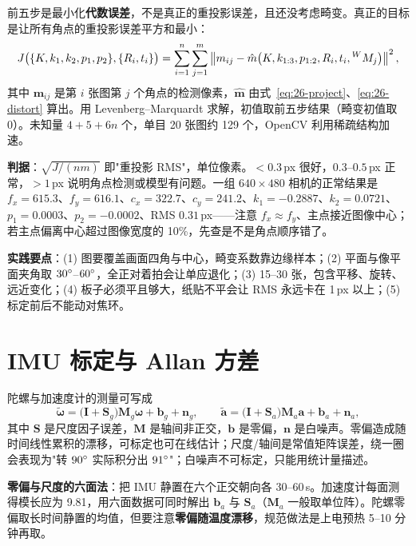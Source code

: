 前五步是最小化\textbf{代数误差}，不是真正的重投影误差，且还没考虑畸变。真正的目标是让所有角点的重投影误差平方和最小：
\begin{equation}
J\bigl(\{K,k_1,k_2,p_1,p_2\},\{R_i,t_i\}\bigr)
=\sum_{i=1}^{n}\sum_{j=1}^{m}\left\lVert m_{ij}-\hat{m}\bigl(K,k_{1:3},p_{1:2},R_i,t_i,{}^{W}M_j\bigr) \right\rVert^{2},
\label{eq:26-reproj}
\end{equation}
其中 $\bm{m}_{ij}$ 是第 $i$ 张图第 $j$ 个角点的检测像素，$\hat{\bm{m}}$ 由式~\eqref{eq:26-project}、\eqref{eq:26-distort} 算出。用 Levenberg--Marquardt 求解，初值取前五步结果（畸变初值取 0）。未知量 $4+5+6n$ 个，单目 20 张图约 129 个，OpenCV 利用稀疏结构加速。

\textbf{判据}：$\sqrt{J/(nm)}$ 即"重投影 RMS"，单位像素。$<0.3$\,px 很好，$0.3$--$0.5$\,px 正常，$>1$\,px 说明角点检测或模型有问题。一组 $640\times480$ 相机的正常结果是 $f_x=615.3$、$f_y=616.1$、$c_x=322.7$、$c_y=241.2$、$k_1=-0.2887$、$k_2=0.0721$、$p_1=0.0003$、$p_2=-0.0002$、RMS $0.31$\,px——注意 $f_x\approx f_y$、主点接近图像中心；若主点偏离中心超过图像宽度的 10\%，先查是不是角点顺序错了。

\textbf{实践要点}：(1) 图要覆盖画面四角与中心，畸变系数靠边缘样本；(2) 平面与像平面夹角取 $30^\circ$--$60^\circ$，全正对着拍会让单应退化；(3) 15--30 张，包含平移、旋转、远近变化；(4) 板子必须平且够大，纸贴不平会让 RMS 永远卡在 1\,px 以上；(5) 标定前后不能动对焦环。

\section{IMU 标定与 Allan 方差}\label{sec:26-imu}

陀螺与加速度计的测量可写成
\begin{equation}
\tilde{\bm{\omega}}=\bigl(\bm{I}+\bm{S}_g\bigr)\bm{M}_g\bm{\omega}+\bm{b}_g+\bm{n}_g,\qquad
\tilde{\bm{a}}=\bigl(\bm{I}+\bm{S}_a\bigr)\bm{M}_a\bm{a}+\bm{b}_a+\bm{n}_a,
\label{eq:26-imuerr}
\end{equation}
其中 $\bm{S}$ 是尺度因子误差，$\bm{M}$ 是轴间非正交，$\bm{b}$ 是零偏，$\bm{n}$ 是白噪声。零偏造成随时间线性累积的漂移，可标定也可在线估计；尺度/轴间是常值矩阵误差，绕一圈会表现为"转 $90^\circ$ 实际积分出 $91^\circ$"；白噪声不可标定，只能用统计量描述。

\textbf{零偏与尺度的六面法}：把 IMU 静置在六个正交朝向各 30--60\,s。加速度计每面测得模长应为 9.81，用六面数据可同时解出 $\bm{b}_a$ 与 $\bm{S}_a$（$\bm{M}_a$ 一般取单位阵）。陀螺零偏取长时间静置的均值，但要注意\textbf{零偏随温度漂移}，规范做法是上电预热 5--10 分钟再取。

